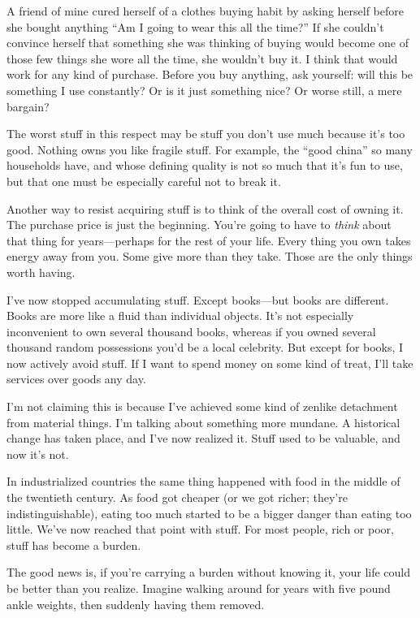 A friend of mine cured herself of a clothes buying habit by asking
herself before she bought anything ``Am I going to wear this all the
time?'' If she couldn't convince herself that something she was thinking
of buying would become one of those few things she wore all the time,
she wouldn't buy it. I think that would work for any kind of purchase.
Before you buy anything, ask yourself: will this be something I use
constantly? Or is it just something nice? Or worse still, a mere
bargain?

The worst stuff in this respect may be stuff you don't use much because
it's too good. Nothing owns you like fragile stuff. For example, the
``good china'' so many households have, and whose defining quality is
not so much that it's fun to use, but that one must be especially
careful not to break it.

Another way to resist acquiring stuff is to think of the overall cost of
owning it. The purchase price is just the beginning. You're going to
have to \emph{think} about that thing for years---perhaps for the rest
of your life. Every thing you own takes energy away from you. Some give
more than they take. Those are the only things worth having.

I've now stopped accumulating stuff. Except books---but books are
different. Books are more like a fluid than individual objects. It's not
especially inconvenient to own several thousand books, whereas if you
owned several thousand random possessions you'd be a local celebrity.
But except for books, I now actively avoid stuff. If I want to spend
money on some kind of treat, I'll take services over goods any day.

I'm not claiming this is because I've achieved some kind of zenlike
detachment from material things. I'm talking about something more
mundane. A historical change has taken place, and I've now realized it.
Stuff used to be valuable, and now it's not.

In industrialized countries the same thing happened with food in the
middle of the twentieth century. As food got cheaper (or we got richer;
they're indistinguishable), eating too much started to be a bigger
danger than eating too little. We've now reached that point with stuff.
For most people, rich or poor, stuff has become a burden.

The good news is, if you're carrying a burden without knowing it, your
life could be better than you realize. Imagine walking around for years
with five pound ankle weights, then suddenly having them removed.